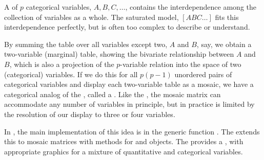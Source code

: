 \documentclass[11pt]{book}\usepackage[]{graphicx}\usepackage[]{color}
\begin{document}
A \mway \ctab of $p$ categorical variables,
$A, B, C,\dots$, contains the interdependence among the collection
of variables as a whole.  The saturated \loglin model, $[A B C\dots]$
fits this interdependence perfectly, but is often too complex to describe
or understand.  

By summing the table over all variables except two,
$A$ and $B$, say, we obtain a two-variable (marginal) table, showing the
bivariate relationship between $A$ and $B$, which is also a projection
of the $p$-variable relation into the space of two (categorical) variables.
If we do this for all $p (p-1)$ unordered pairs of categorical variables
and display each two-variable table as a mosaic,  we have a categorical
analog of the \scatmat, called a
.
Like the \scatmat, the mosaic matrix can accommodate any number of
variables in principle, but in practice is limited by the resolution
of our display to three or four variables.

In \R, the main implementation of this idea is in the generic function
.  The  extends this to 
mosaic matrices with methods 
for  and  objects.
The  provides a ,
with appropriate graphics for a mixture of quantitative and categorical
variables.
\end{document}
